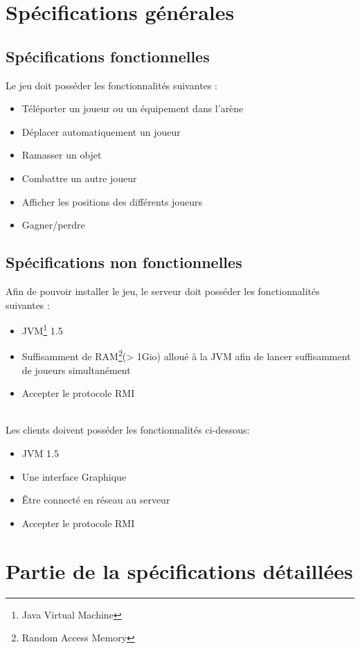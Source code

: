 \documentclass[12pt,a4paper,openany]{book}
\begin{document}
	\section{Spécifications générales}
		\subsection{Spécifications fonctionnelles}
		Le jeu doit posséder les fonctionnalités suivantes : 
		\begin{itemize}
			\item Téléporter un joueur ou un équipement dans l'arène
			\item Déplacer automatiquement un joueur
			\item Ramasser un objet
			\item Combattre un autre joueur
			\item Afficher les positions des différents joueurs
			\item Gagner/perdre
		\end{itemize}

		\subsection{Spécifications non fonctionnelles}
		Afin de pouvoir installer le jeu, le serveur doit posséder les fonctionnalités suivantes : 
		\begin{itemize}
			\item JVM\footnote{Java Virtual Machine} 1.5
			\item Suffisamment de RAM\footnote{Random Access Memory}(> 1Gio) alloué à la JVM afin de lancer suffisamment de joueurs simultanément
			\item Accepter le protocole RMI
		\end{itemize}~\\

		Les clients doivent posséder les fonctionnalités ci-dessous:
		\begin{itemize}
			\item JVM 1.5
			\item Une interface Graphique
			\item Être connecté en réseau au serveur
			\item Accepter le protocole RMI
		\end{itemize}

		\section{Partie de la spécifications détaillées}
\end{document}
